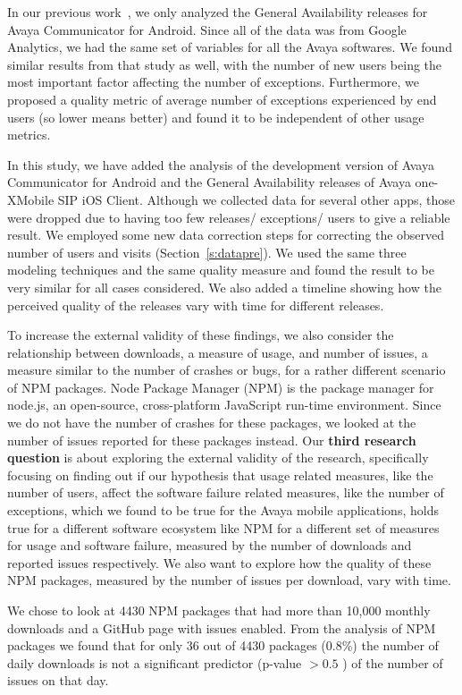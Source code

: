 \documentclass[smallcondensed]{svjour3}     %
\begin{document}
In our previous work~\cite{dey2018modeling}, we only analyzed the
General Availability releases for  Avaya Communicator for
Android. Since all of the data was from Google Analytics, we had
the same set of variables for all the Avaya softwares. We found
similar results from that study as well, with the number of new
users being the most important factor affecting the number of
exceptions. 
Furthermore, we proposed a quality metric of average number of
exceptions experienced by end users (so lower means better) and
found it to be independent of other usage metrics.  

In this study, we have added the analysis of the development version 
of Avaya Communicator for Android and the
General Availability releases of Avaya one-X\textregistered  Mobile
SIP iOS Client. Although we collected data for several other apps,
those were dropped due to having too few releases/ exceptions/ users
to give a reliable result. We employed some new data correction steps 
for correcting the observed number of users and visits (Section~\ref{s:datapre}).
We used the same three modeling techniques and the same quality measure
 and found the result to be very similar for all cases considered. 
We also added a timeline showing how the perceived quality of
the releases vary with time for different releases.   


To increase the external validity of these findings, we also consider
the relationship between downloads, a measure of usage, and number of 
issues, a measure similar to the number of crashes or bugs, for a rather
different scenario of NPM packages. Node Package Manager (NPM) is
the package manager for node.js, an open-source, cross-platform
JavaScript run-time environment.  Since we do not have the number of
crashes for these packages, we looked at the number of issues
reported for these packages instead. Our \textbf{third research question} is about
exploring the external validity of the research, specifically focusing on finding out
if our hypothesis that usage related measures, like the number of users, affect the 
software failure related measures, like the number of exceptions, which we found to be 
true for the Avaya mobile applications, holds true for a different software ecosystem
like NPM for a different set of measures for usage and software failure, measured by 
the number of downloads and reported issues respectively. We also want to explore 
how the quality of these NPM packages, measured by the number of issues per download,
vary with time.

 We chose to look at 4430 NPM packages
that had more than 10,000 monthly downloads and a GitHub page with issues enabled.
From the analysis of NPM packages we found that for only 36 out of
4430 packages (0.8\%) the number of daily downloads is not a
significant predictor (p-value $> 0.5$ ) of the number of issues on
that day. 
\end{document}
